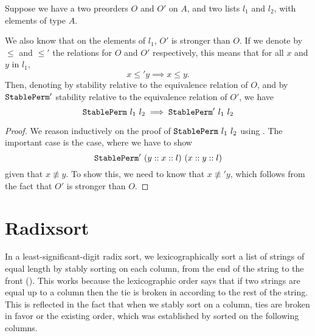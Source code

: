 \documentclass[sigplan,10pt,anonymous,review]{thesis}
\begin{document}
\begin{theorem}
  Suppose we have a two preorders $O$ and $O'$ on $A$, and two lists
  $l_1$ and $l_2$, with elements of type $A$.

  We also know that on the elements of $l_1$, $O'$ is stronger than
  $O$. If we denote by $\le$ and $\le'$ the relations for $O$ and $O'$
  respectively, this means that for all $x$ and $y$ in $l_1$,
  \begin{equation*}
    x \le' y \implies x \le y.
  \end{equation*}
  Then, denoting by  stability relative to the
  equivalence relation of $O$, and by $\texttt{\textup{StablePerm}}'$ stability
  relative to the equivalence relation of $O'$, we have
  \begin{equation*}
    \texttt{\textup{StablePerm}}~l_1~l_2 \implies \texttt{\textup{StablePerm}}'~l_1~l_2
  \end{equation*}
\end{theorem}
\begin{proof}
  We reason inductively on the proof of $\texttt{\textup{StablePerm}}~l_1~l_2$
  using . The important case is the
   case, where we have to show
  \begin{equation*}
    \texttt{\textup{StablePerm}}'~(y :: x :: l)~(x :: y :: l)
  \end{equation*}
  given that $x \not\equiv y$. To show this, we need to know that $x \not\equiv'
  y$, which follows from the fact that $O'$ is stronger than $O$.
\end{proof}

\section{Radixsort}
\label{sec:sort}

In a least-significant-digit radix sort, we lexicographically sort a
list of strings of equal length by stably sorting on each column, from
the end of the string to the front (). This
works because the lexicographic order says that if two strings are
equal up to a column then the tie is broken in according to the rest
of the string. This is reflected in the fact that when we stably sort
on a column, ties are broken in favor or the existing order, which was
established by sorted on the following columns.
\end{document}
